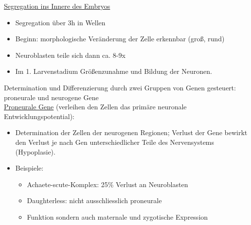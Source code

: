 \documentclass[12pt,a4paper]{article}
\begin{document}
\underline{Segregation ins Innere des Embryos}
\begin{itemize}
	\item Segregation über 3h in Wellen
	\item Beginn: morphologische Veränderung der Zelle erkennbar (groß, rund)
	\item Neuroblasten teile sich dann ca. 8-9x
	\item Im 1. Larvenstadium Größenzunahme und Bildung der Neuronen.
\end{itemize}

Determination und Differenzierung durch zwei Gruppen von Genen gesteuert: proneurale und neurogene Gene\\

\underline{Proneurale Gene} (verleihen den Zellen das primäre neuronale Entwicklungspotential):
\begin{itemize}
	\item Determination der Zellen der neurogenen Regionen; Verlust der Gene bewirkt den Verlust je nach Gen unterschiedlicher Teile des Nervensystems (Hypoplasie).
	\item Beispiele:
		\begin{itemize}
			\item Achaete-scute-Komplex: 25\% Verlust an Neuroblasten
			\item Daughterless: nicht ausschliesslich proneurale 				\item Funktion sondern auch maternale und zygotische Expression
		\end{itemize}
\end{itemize}
\end{document}
